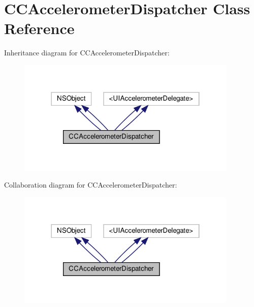 \hypertarget{interfaceCCAccelerometerDispatcher}{}\section{C\+C\+Accelerometer\+Dispatcher Class Reference}
\label{interfaceCCAccelerometerDispatcher}


Inheritance diagram for C\+C\+Accelerometer\+Dispatcher\+:
\nopagebreak
\begin{figure}[H]
\begin{center}
\leavevmode
\includegraphics[width=298pt]{interfaceCCAccelerometerDispatcher__inherit__graph}
\end{center}
\end{figure}


Collaboration diagram for C\+C\+Accelerometer\+Dispatcher\+:
\nopagebreak
\begin{figure}[H]
\begin{center}
\leavevmode
\includegraphics[width=298pt]{interfaceCCAccelerometerDispatcher__coll__graph}
\end{center}
\end{figure}
